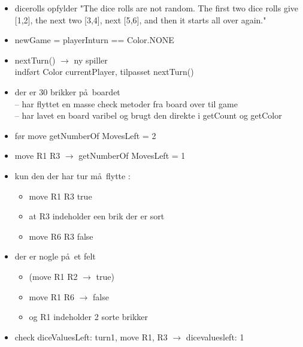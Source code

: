 \documentclass[a4paper]{article}
\begin{document}
\begin{itemize}
\item dicerolls opfylder "The dice rolls are not random. The first two
  dice rolls give [1,2], the next two [3,4], next [5,6], and then it starts all over again."
\item newGame = playerInturn == Color.NONE

\item nextTurn() $\rightarrow$ ny spiller\\
indført Color currentPlayer, tilpasset nextTurn()


\item der er 30 brikker p\aa\ boardet\\
-- har flyttet en masse check metoder fra board over til game\\
-- har lavet en board varibel og brugt den direkte i getCount og getColor\\




\item f\o r move getNumberOf MovesLeft = 2


\item move R1 R3 $\rightarrow$ getNumberOf MovesLeft = 1


\item kun den der har tur m\aa\ flytte : 
  \begin{itemize}

  \item move R1 R3  true

  \item at R3 indeholder een brik der er sort

  \item move R6 R3 false 

  \end{itemize}


\item der er nogle p\aa\ et felt
  \begin{itemize}
  \item (move R1 R2 $\rightarrow$ true) 

  \item move R1 R6 $\rightarrow$ false

  \item og R1 indeholder 2 sorte brikker

  \end{itemize}






\item check diceValuesLeft: turn1, move R1, R3 $\rightarrow$ dicevaluesleft: 1


\end{itemize}
\end{document}
